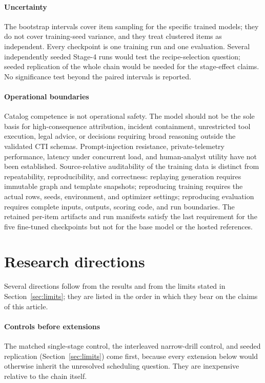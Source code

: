 \documentclass[twocolumn]{svjour3}
\begin{document}
\paragraph{Uncertainty}
The bootstrap intervals cover item sampling for the specific trained models; they do not cover training-seed variance, and they treat clustered items as independent. Every checkpoint is one training run and one evaluation. Several independently seeded Stage-4 runs would test the recipe-selection question; seeded replication of the whole chain would be needed for the stage-effect claims. No significance test beyond the paired intervals is reported.

\paragraph{Operational boundaries}
Catalog competence is not operational safety. The model should not be the sole basis for high-consequence attribution, incident containment, unrestricted tool execution, legal advice, or decisions requiring broad reasoning outside the validated CTI schemas. Prompt-injection resistance, private-telemetry performance, latency under concurrent load, and human-analyst utility have not been established. Source-relative auditability of the training data is distinct from repeatability, reproducibility, and correctness: replaying generation requires immutable graph and template snapshots; reproducing training requires the actual rows, seeds, environment, and optimizer settings; reproducing evaluation requires complete inputs, outputs, scoring code, and run boundaries. The retained per-item artifacts and run manifests satisfy the last requirement for the five fine-tuned checkpoints but not for the base model or the hosted references.

\section{Research directions}\label{sec:directions}
Several directions follow from the results and from the limits stated in Section~\ref{sec:limits}; they are listed in the order in which they bear on the claims of this article.

\paragraph{Controls before extensions}
The matched single-stage control, the interleaved narrow-drill control, and seeded replication (Section~\ref{sec:limits}) come first, because every extension below would otherwise inherit the unresolved scheduling question. They are inexpensive relative to the chain itself.
\end{document}
